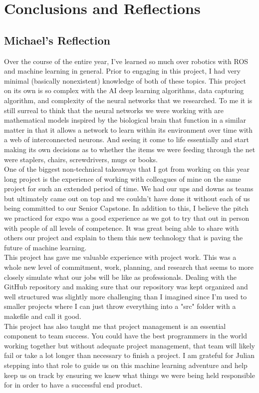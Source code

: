 \documentclass[draftclsnofoot, onecolumn, 10pt, compsoc]{IEEEtran}
\begin{document}
\section{Conclusions and Reflections}
  \subsection{Michael's Reflection}
Over the course of the entire year, I've learned so much over robotics with ROS and machine learning in general. Prior to engaging in this project, I had very minimal (basically nonexistent) knowledge of both of these topics. This project on its own is so complex with the AI deep learning algorithms, data capturing algorithm, and complexity of the neural networks that we researched. To me it is still surreal to think that the neural networks we were working with are mathematical models inspired by the biological brain that function in a similar matter in that it allows a network to learn within its environment over time with a web of interconnected neurons. And seeing it come to life essentially and start making its own decisions as to whether the items we were feeding through the net were staplers, chairs, screwdrivers, mugs or books. \\
One of the biggest non-technical takeaways that I got from working on this year long project is the experience of working with colleagues of mine on the same project for such an extended period of time. We had our ups and downs as teams but ultimately came out on top and we couldn't have done it without each of us being committed to our Senior Capstone. In addition to this, I believe the pitch we practiced for expo was a good experience as we got to try that out in person with people of all levels of competence. It was great being able to share with others our project and explain to them this new technology that is paving the future of machine learning. \\
This project has gave me valuable experience with project work. This was a whole new level of commitment, work, planning, and research that seems to more closely simulate what our jobs will be like as professionals. Dealing with the GitHub repository and making sure that our repository was kept organized and well structured was slightly more challenging than I imagined since I'm used to smaller projects where I can just throw everything into a "src" folder with a makefile and call it good. \\
This project has also taught me that project management is an essential component to team success. You could have the best programmers in the world working together but without adequate project management, that team will likely fail or take a lot longer than necessary to finish a project. I am grateful for Julian stepping into that role to guide us on this machine learning adventure and help keep us on track by ensuring we knew what things we were being held responsible for in order to have a successful end product. \\
\end{document}
